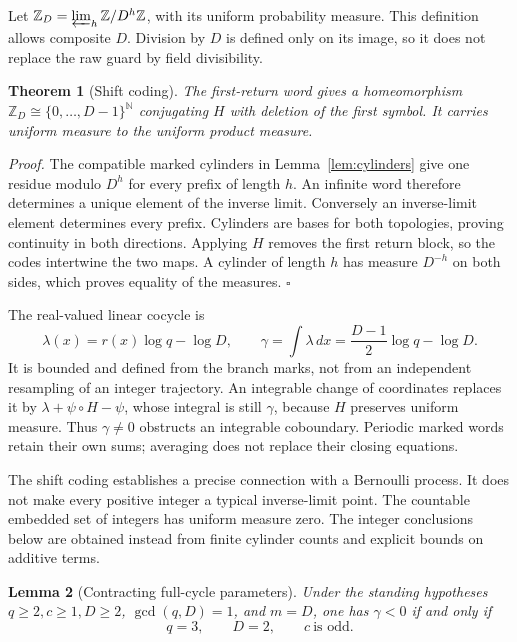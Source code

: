 \documentclass[11pt,letterpaper]{article}
\newcommand{\N}{\mathbb{N}}
\newcommand{\Z}{\mathbb{Z}}
\newtheorem{theorem}{Theorem}
\newtheorem{lemma}[theorem]{Lemma}
\newenvironment{proof}{\noindent\textit{Proof.}}{\hfill\(\square\)}
\begin{document}
Let \(\Z_D=\varprojlim_h\Z/D^h\Z\), with its uniform probability measure.
This definition allows composite \(D\). Division by \(D\) is defined only
on its image, so it does not replace the raw guard by field divisibility.

\begin{theorem}[Shift coding]
\label{thm:shift}
The first-return word gives a homeomorphism
\(\Z_D\cong\{0,\ldots,D-1\}^{\N}\) conjugating \(H\) with deletion of the
first symbol. It carries uniform measure to the uniform product measure.
\end{theorem}

\begin{proof}
The compatible marked cylinders in Lemma~\ref{lem:cylinders} give one
residue modulo \(D^h\) for every prefix of length \(h\). An infinite word
therefore determines a unique element of the inverse limit. Conversely
an inverse-limit element determines every prefix. Cylinders are bases
for both topologies, proving continuity in both directions. Applying
\(H\) removes the first return block, so the codes intertwine the two
maps. A cylinder of length \(h\) has measure \(D^{-h}\) on both sides,
which proves equality of the measures.
\end{proof}

The real-valued linear cocycle is
\[
\lambda(x)=r(x)\log q-\log D,\qquad
\gamma=\int\lambda\,dx=\frac{D-1}{2}\log q-\log D.
\]
It is bounded and defined from the branch marks, not from an independent
resampling of an integer trajectory. An integrable change of coordinates
replaces it by \(\lambda+\psi\circ H-\psi\), whose integral is still
\(\gamma\), because \(H\) preserves uniform measure. Thus \(\gamma\ne0\)
obstructs an integrable coboundary. Periodic marked words retain their
own sums; averaging does not replace their closing equations.

The shift coding establishes a precise connection with a Bernoulli
process. It does not make every positive integer a typical inverse-limit
point. The countable embedded set of integers has uniform measure zero.
The integer conclusions below are obtained instead from finite cylinder
counts and explicit bounds on additive terms.

\begin{lemma}[Contracting full-cycle parameters]
\label{lem:parameters}
Under the standing hypotheses \(q\ge2,c\ge1,D\ge2\),
\(\gcd(q,D)=1\), and \(m=D\), one has \(\gamma<0\) if and only if
\[
q=3,\qquad D=2,\qquad c\ \text{is odd}.
\]
\end{lemma}
\end{document}
